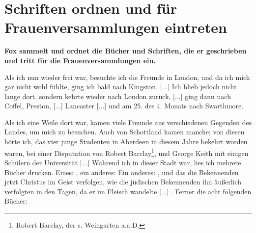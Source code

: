 


\chapter[Schriften ordnen und für Frauenversammlungen eintreten]{Schriften 
ordnen und für Frauenversammlungen eintreten}

\begin{center}
\textbf{Fox sammelt und ordnet die Bücher und Schriften, die er
geschrieben und tritt für die Frauenversammlungen ein.}
\end{center}


Als ich nun wieder frei war, besuchte ich die Freunde in
London, und da ich mich gar nicht wohl fühlte, ging ich bald
nach Kingston. [...] Ich blieb jedoch nicht lange dort, sondern
kehrte wieder nach London zurück, [...] ging dann nach Coffel,
Preston, [...] Lancaster [...] und am 25. des 4. Monats nach
Swarthmore.

Als ich eine Weile dort war, kamen viele Freunde aus verschiedenen 
Gegenden des Landes, um mich zu besuchen. Auch
von Schottland kamen manche; von diesen hörte ich, das vier
junge Studenten in Aberdeen in diesem Jahre bekehrt worden
waren, bei einer Disputation von Robert Barclay\footnote{Robert 
Barclay, der s. Weingarten 
a.a.D.},  und George
Keith mit einigen Schülern der Universität 
[...] Während ich
in dieser Stadt war, lies ich mehrere Bücher drucken. Eines:
, ein anderes:   Ein anderes:
, und das die Bekennenden jetzt
Christus im Geist verfolgen, wie die jüdischen Bekennenden ihn
äußerlich verfolgten in den Tagen, da er im Fleisch wandelte [...] .
Ferner die acht folgenden Bücher: 

